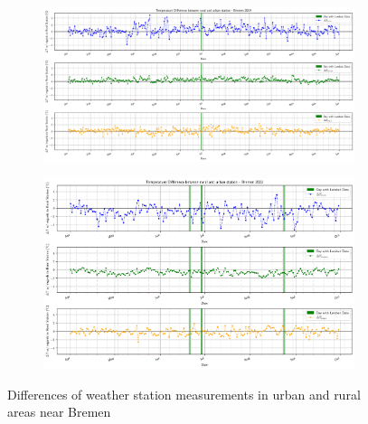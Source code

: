\documentclass[12pt,a4paper, english,twoside]{scrartcl}
\begin{document}
      \begin{figure}[!p]
         \centering
         \begin{subfigure}[b]{\textwidth}
          \includegraphics[width=\textwidth]{img/BremenDifference2019.png}
          \label{fig:diff2015Bre}
         \end{subfigure}
         \begin{subfigure}[b]{\textwidth}
          \includegraphics[width=\textwidth]{img/BremenDifferences2022.png}
          \label{fig:diff20222Bre}
         \end{subfigure}
         \caption{Differences of weather station measurements in urban and rural areas near Bremen}\label{fig:diffBre}
      \end{figure}
   
\end{document}
